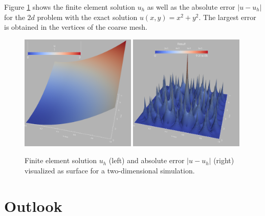 \documentclass[a4paper,12pt]{article}
\begin{document}
Figure \ref{fig:solution} shows the finite element solution $u_h$
as well as the absolute error $|u-u_h|$ for the $2d$ problem with
the exact solution $u(x,y)=x^2+y^2$. The largest error is obtained in the
vertices of the coarse mesh.

\begin{figure}
\begin{center}
\includegraphics[width=0.49\textwidth]{solution}\hfill
\includegraphics[width=0.49\textwidth]{error}
\end{center}
\caption{Finite element solution $u_h$ (left)
and absolute error $|u-u_h|$ (right) visualized as surface for a 
two-dimensional simulation.}
\label{fig:solution}
\end{figure}

\section{Outlook}
\end{document}
